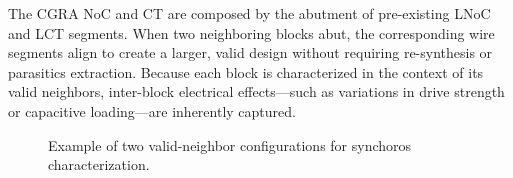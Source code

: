 The CGRA NoC and CT are composed by the abutment of pre-existing LNoC and LCT segments.
When two neighboring blocks abut, the corresponding wire segments align to create a larger, valid design without requiring re-synthesis or parasitics extraction.
Because each block is characterized in the context of its valid neighbors, inter-block electrical effects—such as variations in drive strength or capacitive loading—are inherently captured.

    \begin{figure}
        \centering
        \scriptsize
        
        \caption{\small Example of two valid-neighbor configurations for synchoros characterization.}
        \label{fig:spatial}
    \end{figure}
%


